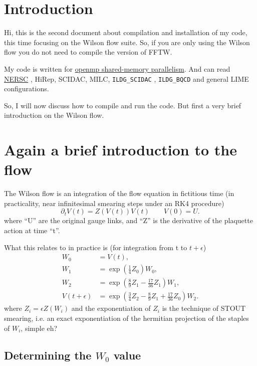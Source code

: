 \documentclass[12pt]{article}
\begin{document}
\section{Introduction}

Hi, this is the second document about compilation and installation of my code, this time focusing on the Wilson flow
suite. So, if you are only using the Wilson flow you do not need to compile the version of FFTW.

My code is written for \href{http://en.wikipedia.org/wiki/Openmp}{openmp shared-memory parallelism}. And can read
\href{http://lattices.qcdoc.bnl.gov/formatDescription/index.html}{NERSC} , HiRep, SCIDAC, MILC, \verb|ILDG_SCIDAC| , \verb|ILDG_BQCD| and general LIME configurations.

So, I will now discuss how to compile and run the code. But first a very brief introduction on the Wilson flow.

\section{Again a brief introduction to the flow}

The Wilson flow is an integration of the flow equation in fictitious time (in practicality, near infinitesimal smearing
steps under an RK4 procedure) \cite{Luscher:2009eq}\cite{Luscher:2010iy}
\begin{equation}
 \partial_t V(t) = Z(V(t)) V(t) \qquad V(0) = U.
\end{equation}
where ``U'' are the original gauge links, and ``Z'' is the derivative of the plaquette action at time ``t''.

What this relates to in practice is (for integration from t to $t+\epsilon$)
\begin{align}
W_0 &= V(t), \nonumber \\
W_1 &= \exp{\left( \frac{1}{4} Z_0 \right)} W_0, \nonumber \\
W_2 &= \exp{\left( \frac{8}{9} Z_1 - \frac{17}{36} Z_1 \right)} W_1, \nonumber \\
V(t+\epsilon) &= \exp{\left(\frac{3}{4}Z_2 - \frac{8}{9}Z_1 + \frac{17}{36}Z_0 \right)} W_2.
\end{align}
where $Z_i = \epsilon Z(W_i)$ and the exponentiation of $Z_i$ is the technique of STOUT smearing, i.e. an exact
exponentiation of the hermitian projection of the staples of $W_i$, simple eh?

\subsection{Determining the $W_0$ value}
\end{document}
